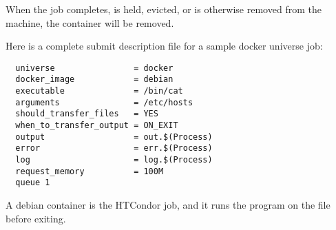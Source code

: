 When the job completes, is held, evicted, 
or is otherwise removed from the machine, the container will be removed.

Here is a complete submit description file for a sample docker universe job:
\begin{verbatim}
  universe                = docker
  docker_image            = debian
  executable              = /bin/cat
  arguments               = /etc/hosts
  should_transfer_files   = YES
  when_to_transfer_output = ON_EXIT
  output                  = out.$(Process)
  error                   = err.$(Process)
  log                     = log.$(Process)
  request_memory          = 100M
  queue 1
\end{verbatim}

A debian container is the HTCondor job,
and it runs the  program on the  file
before exiting.

